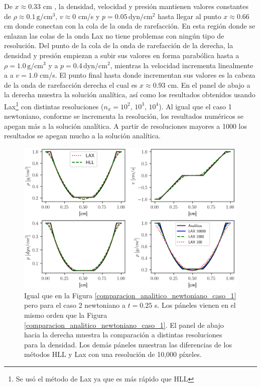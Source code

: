 \documentclass[12pt,a4paper]{book}
\begin{document}
De $x \approx 0.33$ cm , la densidad, velocidad y presión 
mantienen valores constantes de $\rho \approx 0.1 \,  \text{g}/ \text{cm}^3$, $v \approx 0$ cm/s y 
$p = 0.05 \,  \text{dyn}/ \text{cm}^2 $ 
hasta llegar al punto $x \approx 0.66$ cm donde conectan con la cola de la onda de rarefacción. En
esta región donde se enlazan las colas de la onda Lax no tiene problemas con ningún tipo de resolución.
Del punto de la cola de la onda de rarefacción de la derecha, la densidad y presión empiezan a subir 
sus valores en forma parabólica hasta a $\rho  =  1.0 \,  \text{g}/ \text{cm}^3 $ y 
a $p = 0.4 \,  \text{dyn}/ \text{cm}^2 $, 
mientras la velocidad incrementa
linealmente a a $v = 1.0$ cm/s. El punto final hasta donde incrementan sus valores es la cabeza de la onda 
de rarefacción derecha el cual es $ x \approx 0.93 $ cm.
En el panel de abajo a la derecha muestra la solución analítica, así como los resultados obtenidos 
usando Lax\footnote{
  Se usó el método de Lax ya que es más rápido que HLL
}
con distintas resoluciones ($n_x = 10^2, \, 10^3, \,10^4$). Al igual que el caso 1 newtoniano,
conforme se incrementa la resolución, los resultados numéricos se apegan más a la solución analítica.
A partir de resoluciones mayores a 1000 los resultados se apegan mucho a la solución analítica.




\begin{figure}
  \centering
    \includegraphics[width=1.0\textwidth]{./Figuras/verificacion_del_codigo/rarefaction-rarefaction.png}
  \caption{ Igual que en la Figura \ref{comparacion_analitico_newtoniano_caso_1} pero para el 
  caso 2 newtoniano a $t = 0.25$ s. Los páneles vienen en 
  el mismo orden que la Figura \ref{comparacion_analitico_newtoniano_caso_1}.
  El panel de abajo hacia la derecha muestra la comparación a distintas resoluciones para la densidad. 
  Los demás páneles muestran las diferencias de los métodos HLL y Lax con una resolución 
  de 10,000 píxeles.
  \label{comparacion_analitico_newtoniano_caso_2}} 
\end{figure}
\end{document}
